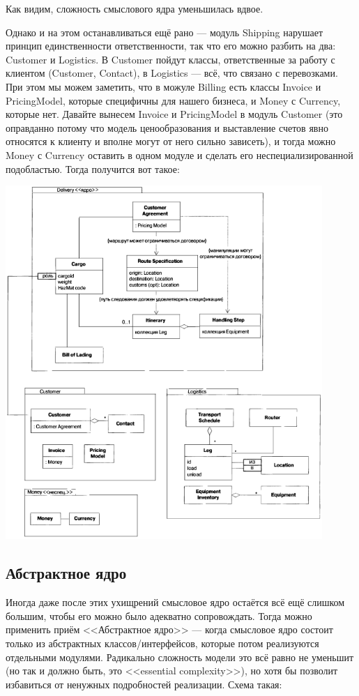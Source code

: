 \documentclass[a5paper]{article}
\begin{document}
Как видим, сложность смыслового ядра уменьшилась вдвое.

Однако и на этом останавливаться ещё рано --- модуль Shipping нарушает принцип единственности ответственности, так что его можно разбить на два: Customer и Logistics. В Customer пойдут классы, ответственные за работу с клиентом (Customer, Contact), в Logistics --- всё, что связано с перевозками. При этом мы можем заметить, что в можуле Billing есть классы Invoice и PricingModel, которые специфичны для нашего бизнеса, и Money с Currency, которые нет. Давайте вынесем Invoice и PricingModel в модуль Customer (это оправданно потому что модель ценообразования и выставление счетов явно относятся к клиенту и вполне могут от него сильно зависеть), и тогда можно Money с Currency оставить в одном модуле и сделать его неспециализированной подобластью. Тогда получится вот такое:

\begin{center}
    \includegraphics[width=0.9\textwidth]{shippingRepacked.png}
\end{center}

\subsection{Абстрактное ядро}

Иногда даже после этих ухищрений смысловое ядро остаётся всё ещё слишком большим, чтобы его можно было адекватно сопровождать. Тогда можно применить приём <<Абстрактное ядро>> --- когда смысловое ядро состоит только из абстрактных классов/интерфейсов, которые потом реализуются отдельными модулями. Радикально сложность модели это всё равно не уменьшит (но так и должно быть, это <<essential complexity>>), но хотя бы позволит избавиться от ненужных подробностей реализации. Схема такая:
\end{document}
